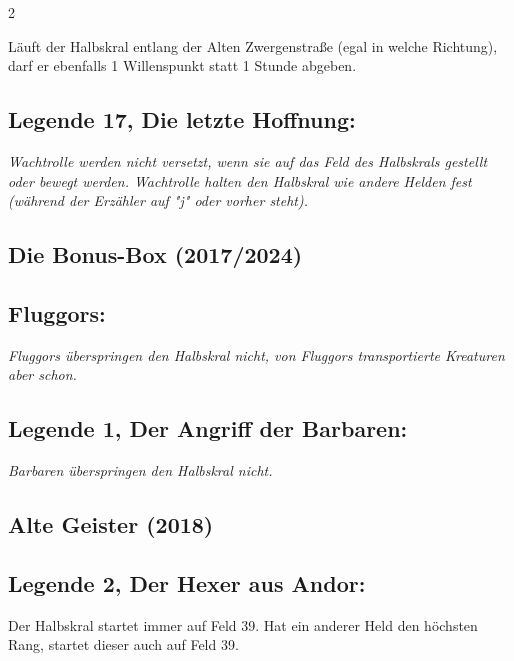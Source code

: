 \documentclass[10pt, a4paper, oneside]{book}
\newcommand{\fan}[1]{\textit{#1}}
\begin{document}
\begin{multicols*}{2}
\begin{bgcolor}
Läuft der Halbskral entlang der Alten Zwergenstraße (egal in welche Richtung), darf er ebenfalls 1 Willenspunkt statt 1 Stunde abgeben.



\subsection{Legende 17, Die letzte Hoffnung:}

\fan{Wachtrolle werden nicht versetzt, wenn sie auf das Feld des Halbskrals gestellt oder bewegt werden. Wachtrolle halten den Halbskral wie andere Helden fest (während der Erzähler auf "j" oder vorher steht).} 

\end{bgcolor}




\begin{bgcolor}[color-BB]
\section{Die Bonus-Box (2017/2024)}



\subsection{Fluggors:}


\fan{Fluggors überspringen den Halbskral nicht, von Fluggors transportierte Kreaturen aber schon.}


\subsection{Legende 1, Der Angriff der Barbaren:}

\fan{Barbaren überspringen den Halbskral nicht.}

\end{bgcolor}




\begin{bgcolor}[color-AG]
\section{Alte Geister (2018)}

\subsection{Legende 2, Der Hexer aus Andor:}

Der Halbskral startet immer auf Feld 39. Hat ein anderer Held den höchsten Rang, startet dieser auch auf Feld 39.


\end{bgcolor}
\end{multicols*}
\end{document}
